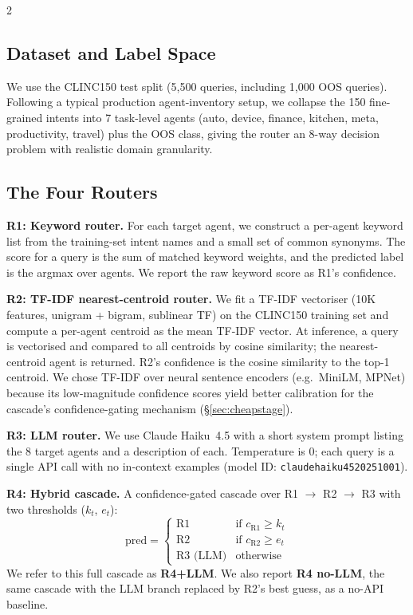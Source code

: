 \documentclass[11pt,a4paper]{article}
\begin{document}
\begin{multicols}{2}
\subsection{Dataset and Label Space}

We use the CLINC150 test split (5,500 queries, including 1,000 OOS queries). Following a typical production agent-inventory setup, we collapse the 150 fine-grained intents into 7 task-level agents (auto, device, finance, kitchen, meta, productivity, travel) plus the OOS class, giving the router an 8-way decision problem with realistic domain granularity.

\subsection{The Four Routers}

\textbf{R1: Keyword router.} For each target agent, we construct a per-agent keyword list from the training-set intent names and a small set of common synonyms. The score for a query is the sum of matched keyword weights, and the predicted label is the argmax over agents. We report the raw keyword score as R1's confidence.

\textbf{R2: TF-IDF nearest-centroid router.} We fit a TF-IDF vectoriser (10K features, unigram + bigram, sublinear TF) on the CLINC150 training set and compute a per-agent centroid as the mean TF-IDF vector. At inference, a query is vectorised and compared to all centroids by cosine similarity; the nearest-centroid agent is returned. R2's confidence is the cosine similarity to the top-1 centroid. We chose TF-IDF over neural sentence encoders (e.g.\ MiniLM, MPNet) because its low-magnitude confidence scores yield better calibration for the cascade's confidence-gating mechanism (\S\ref{sec:cheapstage}).

\textbf{R3: LLM router.} We use Claude Haiku~4.5 with a short system prompt listing the 8 target agents and a description of each. Temperature is 0; each query is a single API call with no in-context examples (model ID: \texttt{claude\text{-}haiku\text{-}4\text{-}5\text{-}20251001}).

\textbf{R4: Hybrid cascade.} A confidence-gated cascade over R1 $\to$ R2 $\to$ R3 with two thresholds ($k_t$, $e_t$):
\begin{equation*}
\text{pred} = \begin{cases}
\text{R1} & \text{if } c_{\text{R1}} \geq k_t \\
\text{R2} & \text{if } c_{\text{R2}} \geq e_t \\
\text{R3 (LLM)} & \text{otherwise}
\end{cases}
\end{equation*}
We refer to this full cascade as \textbf{R4+LLM}. We also report \textbf{R4 no-LLM}, the same cascade with the LLM branch replaced by R2's best guess, as a no-API baseline.


\end{multicols}
\end{document}
